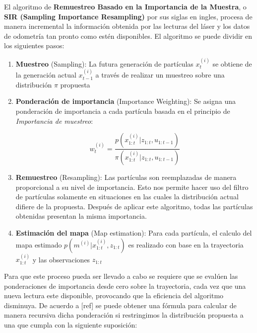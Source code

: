 \documentclass[10pt,a4paper]{article}
\begin{document}
El algoritmo de \textbf{Remuestreo Basado en la Importancia de la Muestra}, o \textbf{SIR (Sampling Importance Resampling)} por sus siglas en ingles, procesa de manera incremental la información obtenida por las lecturas del láser y los datos de odometría tan pronto como estén disponibles. El algoritmo se puede dividir en los siguientes pasos:

\begin{mdframed}

\begin{enumerate}

	\item \textbf{Muestreo} (Sampling): La futura generación de partículas {$ x_{t}^{(i)} $} se obtiene de la generación actual {$ x_{t-1}^{(i)} $} a través de realizar un muestreo sobre una distribución $ \pi $ propuesta

	\item \textbf{Ponderación de importancia} (Importance Weighting): Se asigna una ponderación de importancia a cada partícula basada en el principio de \emph{Importancia de muestreo}:

	\begin{equation}
	\label{eq:weigth}
		w_{t}^{(i)} = 
			\frac{ p( x_{1:t}^{(i)} | z_{1:t}, u_{1:t-1} ) }
				{ \pi ( x_{1:t}^{(i)} | z_{1:t}, u_{1:t-1} ) }
	\end{equation}
	
	\item \textbf{Remuestreo} (Resampling): Las partículas son reemplazadas de manera proporcional a su nivel de importancia. Esto nos permite hacer uso del filtro de partículas solamente en situaciones en las cuales la distribución actual difiere de la propuesta. Después de aplicar este algoritmo, todas las partículas obtenidas presentan la misma importancia.
	
	\item \textbf{Estimación del mapa} (Map estimation): Para cada partícula, el  calculo del mapa estimado $ p( m^{(i)} | x_{1:t}^{(i)}, z_{1:t}) $ es realizado con base en la trayectoria $ x_{1:t}^{(i)} $ y las observaciones $ z_{1:t} $ 

\end{enumerate}
\end{mdframed}

Para que este proceso pueda ser llevado a cabo se requiere que se evalúen las ponderaciones de importancia desde cero sobre la trayectoria, cada vez que una nueva lectura este disponible, provocando que la eficiencia del algoritmo disminuya. De acuerdo a [ref] se puede obtener una fórmula para calcular de manera recursiva dicha ponderación si restringimos la distribución propuesta a una que cumpla con la siguiente suposición:
\end{document}
